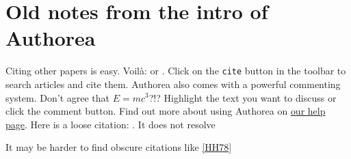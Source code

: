 \section{Old notes from the intro of Authorea}

Citing other papers is easy. Voilà: \cite{2012} or \cite{Holstein_2009}. Click on the \verb|cite| button in the toolbar to search articles and cite them. Authorea also comes with a powerful commenting system. Don't agree that $E  =  mc^{3}$?!? Highlight the text you want to discuss or click the comment button. Find out more about using Authorea on \href{https://www.authorea.com/help}{our help page}. Here is a loose citation: \cite{Hogeweg_2011}. It does not resolve\ldot
 
It may be harder to find obscure citations like \ref{HH78}
  
  
  
  
  
  